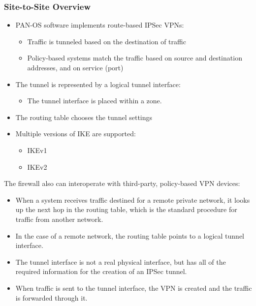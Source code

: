 \subsubsection{Site-to-Site Overview}
\begin{itemize}
    \item PAN-OS software implements route-based IPSec VPNs:
        \begin{itemize}
            \item Traffic is tunneled based on the destination of traffic
            \item Policy-based systems match the traffic based on source and destination addresses, and on service (port)
        \end{itemize}
    \item The tunnel is represented by a logical tunnel interface:
        \begin{itemize}
            \item The tunnel interface is placed within a zone.
        \end{itemize}
    \item The routing table chooses the tunnel settings
    \item Multiple versions of IKE are supported:
        \begin{itemize}
            \item IKEv1
            \item IKEv2
        \end{itemize}
\end{itemize}
The firewall also can interoperate with third-party, policy-based VPN devices:
\begin{itemize}
    \item When a system receives traffic destined for a remote private network, it looks up the next hop in the routing table, which is the standard procedure for traffic from another network.
    \item In the case of a remote network, the routing table points to a logical tunnel interface.
    \item The tunnel interface is not a real physical interface, but has all of the required information for the creation of an IPSec tunnel.
    \item When traffic is sent to the tunnel interface, the VPN is created and the traffic is forwarded through it.
\end{itemize}

